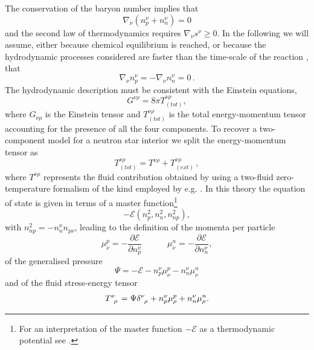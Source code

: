 \documentclass[usenatbib%
]{mnras}
\newcommand{\spc}{\quad \quad \quad}
\begin{document}
The conservation of the baryon number implies that 
\begin{equation}
\nabla_\nu (n_p^\nu + n_n^\nu )=0
\end{equation}
and the second law of thermodynamics requires $\nabla_\nu s^\nu \geq 0$. 
In the following we will assume, either because chemical equilibrium is reached, or because the hydrodynamic processes considered are faster than the time-scale of the reaction \citep{Termo}, that
\begin{equation}
\nabla_\nu n_p^\nu = -\nabla_\nu n_n^\nu =0 \, .
\end{equation}
The hydrodynamic description must be consistent with the Einstein equations,
\begin{equation}\label{einstein}
G^{\nu \rho} = 8\pi T^{\nu \rho}_{(tot)}, 
\end{equation}
where $G_{\nu \rho}$ is the Einstein tensor and $T_{(tot)}^{\nu \rho}$ is the total energy-momentum tensor accounting for the presence of all the four components. 
To recover a two-component model for a neutron star interior we split the energy-momentum tensor as
\begin{equation}\label{TOT}
T_{(tot)}^{\nu \rho} = T^{\nu \rho} + T_{(ext)}^{\nu \rho} \, ,
\end{equation} 
where $T^{\nu \rho}$ represents the fluid contribution obtained by using a two-fluid zero-temperature formalism of the kind employed by e.g. \cite{andersson_comer2000}. 
In this theory the equation of state is given in terms of a master function\footnote{
For an interpretation of the master function $ -\mathcal{E}$ as a thermodynamic potential see \cite{Termo}.} \citep{noto_rel, andersson2007review}
\begin{equation}
 -\mathcal{E} (n_p^2, n_n^2, n_{np}^2),
\end{equation}
with $n_{np}^2 = -n_n^\nu n_{p\nu}$, leading to the definition of the momenta per particle
\begin{equation}\label{pqwoeiru}
\mu_{\nu}^p = -\dfrac{\partial \mathcal{E}}{\partial n_p^\nu}  \spc  \mu_{\nu}^n = -\dfrac{\partial \mathcal{E}}{\partial n_n^\nu},
\end{equation}
of the generalised pressure
\begin{equation}
\Psi = -\mathcal{E} - n_p^\nu \mu_{\nu}^p - n_n^\nu \mu_{\nu}^n
\end{equation}
and of the fluid stress-energy tensor
\begin{equation}
T\indices{^\nu _\rho} = \Psi \delta\indices{^\nu _\rho} + n_p^\nu \mu_{\rho}^p + n_n^\nu \mu_{\rho}^n.
\end{equation}
\end{document}
